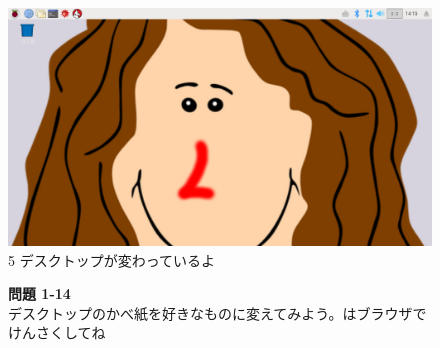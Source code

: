 \begin{figure}
  \bigskip


  \flushleft
  \begin{minipage}{0.45\textwidth}
    \includegraphics[width=0.85\linewidth]{text01-img/textbook-img111.png}\\
    5 デスクトップが変わっているよ
  \end{minipage}

  \bigskip

  \noindent \textbf{問題 1-14}\\
  デスクトップのかべ紙を好きなものに変えてみよう。はブラウザでけんさくしてね
\end{figure}

\bigskip

